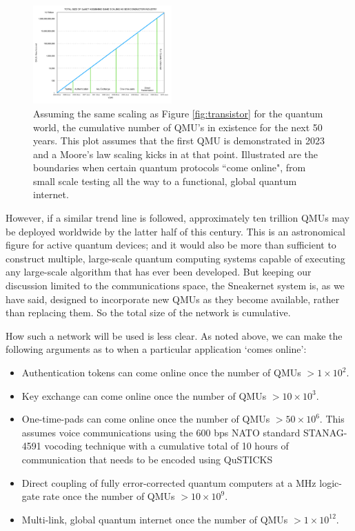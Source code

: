 \documentclass[twocolumn, aps, rmp, amsmath, amssymb, nofootinbib, superscriptaddress, longbibliography, floatfix, table-of-contents, eqsecnum]{revtex4-2}
\begin{document}
\begin{figure}[htbp!]
	\includegraphics[clip=true, width=0.475\textwidth]{QMU}
	\caption{Assuming the same scaling as Figure \ref{fig:transistor} for the quantum world, the cumulative number of QMU's in existence for the next 50 years.  This plot assumes that the first QMU is demonstrated in 2023 and a Moore's law scaling kicks in at that point.  Illustrated are the boundaries when certain quantum protocols ``come online", from small scale testing all the way to a functional, global quantum internet.} \label{fig:QMU}
\end{figure}

However, if a similar trend line is followed, approximately ten trillion QMUs may be deployed worldwide by the latter half of this century. This is an astronomical figure for active quantum devices; and it would also be more than sufficient to construct multiple, large-scale quantum computing systems capable of executing any large-scale algorithm that has ever been developed. But keeping our discussion limited to the communications space, the Sneakernet system is, as we have said, designed to incorporate new QMUs as they become available, rather than replacing them. So the total size of the network is cumulative. 

How such a network will be used is less clear. As noted above, we can make the following arguments as to when a particular application `comes online':
\begin{itemize}
\item Authentication tokens can come online once the number of QMUs $> 1\times 10^2$. 
\item Key exchange can come online once the number of QMUs $> 10\times 10^3$.
\item One-time-pads can come online once the number of QMUs $> 50\times 10^6$. This assumes voice communications using the 600 bps NATO standard STANAG-4591 vocoding technique with a cumulative total of 10 hours of communication that needs to be encoded using QuSTICKS %
\item Direct coupling of fully error-corrected quantum computers at a MHz logic-gate rate once the number of QMUs $> 10\times 10^9$. 
\item Multi-link, global quantum internet once the number of QMUs $> 1\times 10^{12}$.
\end{itemize}
\end{document}
